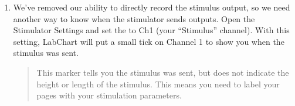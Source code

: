 \documentclass[letterpaper,10pt,english]{jupyterBook}
\begin{document}
\begin{enumerate}
\begin{itemize}
\item {} 
\sphinxAtStartPar
Make sure that  is listed under the Input Amplifier column for Channel 3.

\item {} 
\sphinxAtStartPar
{} Channel 2 — we don’t need to record from it anymore.

\item {} 
\sphinxAtStartPar
Change the name of Channel 3 to 

\end{itemize}

\item {} 
\sphinxAtStartPar
We’ve removed our ability to directly record the stimulus output, so we need another way to know when the stimulator sends outputs. Open the Stimulator Settings and set the  to Ch1 (your “Stimulus” channel). With this setting, LabChart will put a small tick on Channel 1 to show you when the stimulus was sent.
\begin{quote}

\sphinxAtStartPar
{} This marker tells you  the stimulus was sent, but does not indicate the height or length of the stimulus. This means you need to label your pages with your stimulation parameters.
\end{quote}

\end{enumerate}
\end{document}
